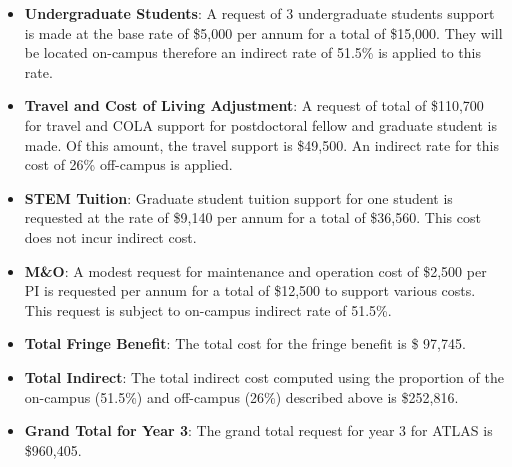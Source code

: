\begin{enumerate}
\begin{itemize}
\item {{\bf Undergraduate Students}: A request of 3 undergraduate students support is made at the base rate of \$5,000 per annum for a total of \$15,000. They will be located on-campus therefore an indirect rate of 51.5\% is applied to this rate. }

\item{{\bf Travel and Cost of Living Adjustment}: A request of total of \$110,700 for travel and COLA support for postdoctoral fellow and graduate student is made. Of this amount, the travel support is \$49,500.  An indirect rate for this cost of 26\% off-campus is applied. }

\item {{\bf STEM Tuition}: Graduate student tuition support for one student is requested at the rate of \$9,140 per annum for a total of \$36,560.  This cost does not incur indirect cost.}

\item {{\bf M\&O}:  A modest request for maintenance and operation cost of \$2,500 per PI is requested per annum for a total of \$12,500 to support various costs. This request is subject to on-campus indirect rate of 51.5\%.}

\item {{\bf Total Fringe Benefit}:  The total cost for the fringe benefit is \$ 97,745.}

\item {{\bf Total Indirect}: The total indirect cost computed using the proportion of the on-campus (51.5\%) and off-campus (26\%) described above is \$252,816.}

\item {{\bf Grand Total for Year 3}: The grand total request for year 3 for ATLAS is \$960,405.}

\end{itemize}
\end{enumerate}

\newpage
